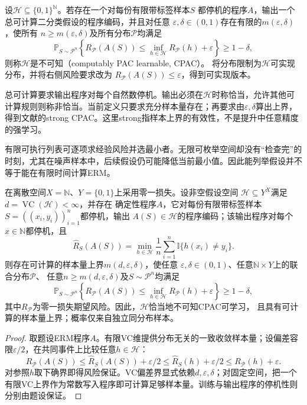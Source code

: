 \begin{definition}[可计算PAC学习]
\label{def:binary-computable-pac}
设$\mathcal H\subseteq\{0,1\}^{\mathbb N}$。若存在一个对每份有限带标签样本$S$
都停机的程序$A$，输出一个总可计算二分类假设的程序编码，并且对任意
$\varepsilon,\delta\in(0,1)$存在有限的$m(\varepsilon,\delta)$，使所有
$n\geq m(\varepsilon,\delta)$及所有分布$\mathcal P$均满足
\[
 \mathbb P_{S\sim\mathcal P^n}\left\{
 R_{\mathcal P}(A(S))\leq\inf_{h\in\mathcal H}R_{\mathcal P}(h)+\varepsilon
 \right\}\geq1-\delta,
\]
则称$\mathcal H$是不可知（computably PAC learnable, CPAC）。
将分布限制为$\mathcal H$可实现分布，并将右侧风险要求改为
$R_{\mathcal P}(A(S))\leq\varepsilon$，得到可实现版本。
\end{definition}

总可计算要求输出程序对每个自然数停机。输出必须在$\mathcal H$时称恰当，允许其他可计算规则则称非恰当。当前定义只要求充分样本量存在；再要求由$\varepsilon,\delta$算出上界，得到文献的strong CPAC。这里strong指样本上界的有效性，不是提升中任意精度的强学习。

有限可执行列表可逐项求经验风险并选最小者。无限可枚举空间却没有“检查完”的时刻，尤其在噪声样本中，后续假设仍可能降低当前最小值。因此能列举假设并不等于能在有限时间计算ERM。

\begin{theorem}[可计算ERM给出的学习保证]
\label{thm:computable-erm-pac}
在离散空间$X=\mathbb N$、$Y=\{0,1\}$上采用零一损失。设非空假设空间
$\mathcal H\subseteq Y^X$满足$d=\operatorname{VC}(\mathcal H)<\infty$，并存在
确定性程序$A$，它对每份有限带标签样本$S=((x_i,y_i))_{i=1}^n$都停机，输出
$A(S)\in\mathcal H$的程序编码；该输出程序对每个$x\in\mathbb N$都停机，且
\[
 \hat R_S(A(S))
 =\min_{h\in\mathcal H}\frac1n\sum_{i=1}^n\mathbb I\{h(x_i)\neq y_i\}.
\]
则存在可计算的样本量上界$m(d,\varepsilon,\delta)$，使任意
$\varepsilon,\delta\in(0,1)$、任意$\mathbb N\times Y$上的联合分布$\mathcal P$、
任意$n\geq m(d,\varepsilon,\delta)$及$S\sim\mathcal P^n$均满足
\[
 \mathbb P_{S\sim\mathcal P^n}\left\{
 R_{\mathcal P}(A(S))
 \leq\inf_{h\in\mathcal H}R_{\mathcal P}(h)+\varepsilon
 \right\}\geq1-\delta,
\]
其中$R_{\mathcal P}$为零一损失期望风险。因此，$\mathcal H$恰当地不可知CPAC可学习，
且具有可计算的样本量上界；概率仅来自独立同分布样本。
\end{theorem}

\begin{proof}
取题设ERM程序$A$。有限VC维提供分布无关的一致收敛样本量；设偏差容限$\varepsilon/2$，在共同事件上比较任意$h\in\mathcal H$：
\[
 R_{\mathcal P}(A(S))
 \leq\hat R_S(A(S))+\varepsilon/2
 \leq\hat R_S(h)+\varepsilon/2
 \leq R_{\mathcal P}(h)+\varepsilon.
\]
对参照$h$取下确界即得风险保证。VC偏差界显式依赖$d,\varepsilon,\delta$；对固定空间，把一个有限VC上界作为常数写入程序即可计算足够样本量。训练与输出程序的停机性则分别由题设保证。
\end{proof}

